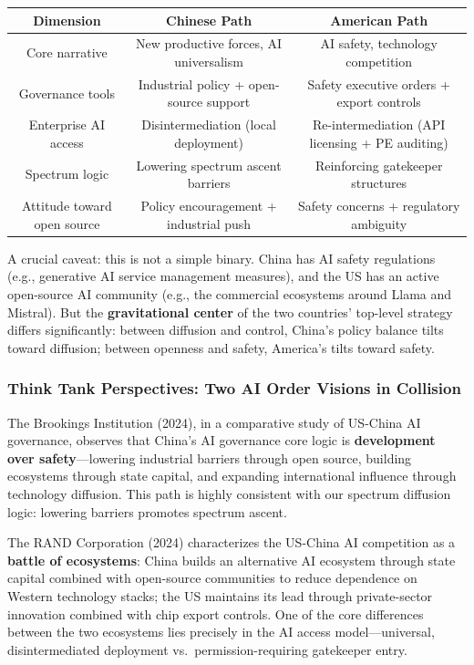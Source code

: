 ﻿\documentclass[12pt,a4paper]{article}
\begin{document}
\begin{center}
\begin{tabular}{c|c|c}
\hline
Dimension & Chinese Path & American Path \\
\hline
Core narrative & New productive forces, AI universalism & AI safety, technology competition \\
Governance tools & Industrial policy + open-source support & Safety executive orders + export controls \\
Enterprise AI access & Disintermediation (local deployment) & Re-intermediation (API licensing + PE auditing) \\
Spectrum logic & Lowering spectrum ascent barriers & Reinforcing gatekeeper structures \\
Attitude toward open source & Policy encouragement + industrial push & Safety concerns + regulatory ambiguity \\
\hline
\end{tabular}
\end{center}

A crucial caveat: this is not a simple binary. China has AI safety regulations (e.g., generative AI service management measures), and the US has an active open-source AI community (e.g., the commercial ecosystems around Llama and Mistral). But the \textbf{gravitational center} of the two countries' top-level strategy differs significantly: between diffusion and control, China's policy balance tilts toward diffusion; between openness and safety, America's tilts toward safety.

\subsubsection{Think Tank Perspectives: Two AI Order Visions in Collision}

The Brookings Institution (2024), in a comparative study of US-China AI governance, observes that China's AI governance core logic is \textbf{development over safety}---lowering industrial barriers through open source, building ecosystems through state capital, and expanding international influence through technology diffusion. This path is highly consistent with our spectrum diffusion logic: lowering barriers promotes spectrum ascent.

The RAND Corporation (2024) characterizes the US-China AI competition as a \textbf{battle of ecosystems}: China builds an alternative AI ecosystem through state capital combined with open-source communities to reduce dependence on Western technology stacks; the US maintains its lead through private-sector innovation combined with chip export controls. One of the core differences between the two ecosystems lies precisely in the AI access model---universal, disintermediated deployment vs.\ permission-requiring gatekeeper entry.
\end{document}
